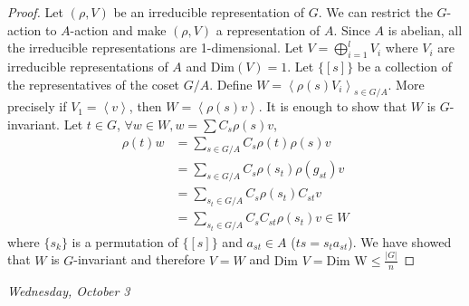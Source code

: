 \documentclass[letterpaper, leqno, 12pt]{article}
\providecommand{\abs}[1]{\left\lvert#1\right\rvert}
\providecommand{\ip}[1]{\left\langle #1 \right\rangle}
\newcommand {\repV} {(\rho,V)}
\theoremstyle{stdthm}
\theoremstyle{stddef}
\theoremstyle{stdnonum}
\theoremstyle{stdqands}
\theoremstyle{stdbold}
\begin{document}
\begin{proof}
Let $\repV$ be an irreducible representation of $G$. We can restrict the $G$-action to $A$-action and make $\repV$ a representation of $A$. Since $A$ is abelian, all the irreducible representations are 1-dimensional. Let $V = \bigoplus_{i=1}^l V_i$ where $V_i$ are irreducible representations of $A$ and $\text{Dim}(V) = 1$. Let $\{[s]\}$ be a collection of the representatives of the coset $G/A$.  Define $W = \ip{\rho(s)V_i}_{s \in G/A}$. More precisely if $V_1 = \ip{v}$, then $W = \ip{\rho(s)v}$. It is enough to show that $W$ is $G$-invariant. Let $t \in G$, $\forall w \in W, w = \sum C_s \rho(s)v$,
\begin{align*}
\rho(t) w &= \sum_{s \in G/A} C_s \rho(t) \rho(s) v\\
&= \sum_{s \in G/A} C_s \rho(s_t) \rho(g_{st}) v\\
&= \sum_{s_t \in G/A} C_s \rho(s_t) C_{st}v\\
&= \sum_{s_t \in G/A} C_s C_{st} \rho(s_t)v \in W
\end{align*}
where $\{s_k\}$ is a permutation of $\{[s]\}$ and $a_{st} \in A$ ($ts = s_t a_{st}$). We have showed that $W$ is $G$-invariant and therefore $V = W$ and $\text{Dim } V = \text{Dim W} \leq \frac{\abs{G}}{n}$ 
\end{proof}
\newpage
\begin{center}
\emph{Wednesday, October 3}
\end{center}
\end{document}
